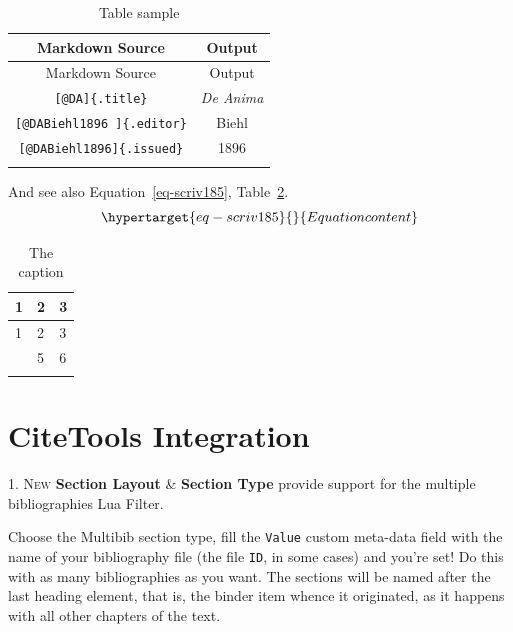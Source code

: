 \documentclass[
  12pt,
  a4paper,
  numbers=noenddot,
  titlepage,
  toclink=all,
  toc=bibliography]{scrbook}
\theoremstyle{plain}
\theoremstyle{plain}
\theoremstyle{definition}
\theoremstyle{plain}
\theoremstyle{definition}
\theoremstyle{definition}
\theoremstyle{plain}
\theoremstyle{plain}
\theoremstyle{remark}
\begin{document}
\hypertarget{tbl-scriv184}{}
\begin{longtable}[]{@{}cc@{}}
\toprule\noalign{}
Markdown Source & Output \\
\midrule\noalign{}
\endfirsthead
\toprule\noalign{}
Markdown Source & Output \\
\midrule\noalign{}
\endhead
\bottomrule\noalign{}
\endlastfoot
\texttt{{[}@DA{]}\{.title\}} & \emph{De Anima} \\
\texttt{{[}@DABiehl1896\ {]}\{.editor\}} & Biehl \\
\texttt{{[}@DABiehl1896{]}\{.issued\}} & 1896 \\
\caption{\label{tbl-scriv184}Table sample}\tabularnewline
\end{longtable}

And see also
\protect\hypertarget{cite_57}{}{\label{cite_57}Equation~\ref{eq-scriv185}},
\protect\hypertarget{cite_58}{}{\label{cite_58}Table~\ref{tbl-scriv186}}.\\
\begin{equation}\protect\hypertarget{eq-scriv185}{}{Equation content
}\label{eq-scriv185}\end{equation}

\hypertarget{tbl-scriv186}{}
\begin{longtable}[]{@{}lll@{}}
\toprule\noalign{}
1 & 2 & 3 \\
\midrule\noalign{}
\endfirsthead
\toprule\noalign{}
1 & 2 & 3 \\
\midrule\noalign{}
\endhead
\bottomrule\noalign{}
\endlastfoot
4 & 5 & 6 \\
\caption{\label{tbl-scriv186}The caption}\tabularnewline
\end{longtable}

\hypertarget{sec-scriv187}{%
\section{CiteTools Integration}\label{sec-scriv187}}

\protect\hypertarget{scriv187}{}{}

\protect\hypertarget{scriv188}{}{} \textsc{1. New} \textbf{Section
Layout} \& \textbf{Section Type} provide support for the multiple
bibliographies Lua Filter.

Choose the Multibib section type, fill the \texttt{Value} custom
meta-data field with the name of your bibliography file (the file
\texttt{ID}, in some cases) and you're set! Do this with as many
bibliographies as you want. The sections will be named after the last
heading element, that is, the binder item whence it originated, as it
happens with all other chapters of the text.
\end{document}
